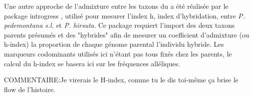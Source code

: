 Une autre approche de l'admixture entre les taxons du  a été réalisée par le package introgress \citep{Gompert2010}, utilisé pour mesurer l'index h, index d'hybridation, entre \textit{P. pedemontana s.l.} et \textit{P. hirsuta}.
 Ce package requiert l'import des deux taxons parents présumés et des "hybrides" afin de mesurer un coefficient d'admixture (ou h-index) \DIFdelbegin {}\DIFdelend \DIFaddbegin {}\DIFaddend la proportion de chaque génome parental \DIFdelbegin {}\DIFdelend \DIFaddbegin {}\DIFaddend l'individu hybride.
 Les marqueurs codominants utilisés ici n'étant pas tous fixés chez les parents, le calcul du h-index se basera ici sur les fréquences alléliques.

COMMENTAIRE:Je virerais le H-index, comme tu le dis toi-même ça brise le flow de l'histoire.

